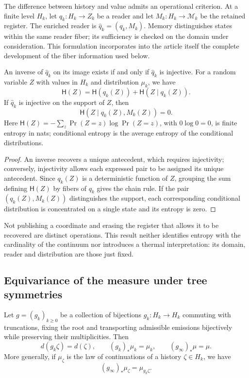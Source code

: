 The difference between history and value admits an operational criterion. At a
finite level \(H_k\), let \(q_k:H_k\to Z_k\) be a reader and let
\(M_k:H_k\to\mathcal M_k\) be the retained register. The enriched reader
is \(\widehat q_k=(q_k,M_k)\). Memory distinguishes states within the same
reader fiber; its sufficiency is checked on the domain under consideration.
This formulation incorporates into the article itself the complete development of the
fiber information used below.

\begin{proposition}
\label{prop:ch-recuperabilidad-fibra}
An inverse of \(\widehat q_k\) on its image exists if and only if
\(\widehat q_k\) is injective. For a random variable \(Z\) with
values in \(H_k\) and distribution \(\mu_k\), we have
\[
 \mathsf H(Z)=\mathsf H(q_k(Z))+\mathsf H(Z\mid q_k(Z)).
\]
If \(\widehat q_k\) is injective on the support of \(Z\), then
\[
 \mathsf H(Z\mid q_k(Z),M_k(Z))=0.
\]
Here \(\mathsf H(Z)=-\sum_z\Pr(Z=z)\log\Pr(Z=z)\), with
\(0\log0=0\), is finite entropy in nats; conditional entropy is
the average entropy of the conditional distributions.
\end{proposition}

\begin{proof}
An inverse recovers a unique antecedent, which requires injectivity;
conversely, injectivity allows each expressed pair to be assigned its unique
antecedent. Since \(q_k(Z)\) is a deterministic function of \(Z\),
grouping the sum defining \(\mathsf H(Z)\) by fibers of \(q_k\) gives the
chain rule. If the pair \((q_k(Z),M_k(Z))\) distinguishes the support,
each corresponding conditional distribution is concentrated on a single
state and its entropy is zero.
\end{proof}

Not publishing a coordinate and erasing the register that allows it to be recovered are
distinct operations. This result neither identifies entropy with the cardinality
of the continuum nor introduces a thermal interpretation: its domain, reader and
distribution are those just fixed.

\subsection{Equivariance of the measure under tree symmetries}
\label{sec:ch-naturalidad-medida}

\begin{proposition}
\label{prop:ch-naturalidad-medida}
Let \(g=(g_k)_{k\geq0}\) be a collection of bijections \(g_k:H_k\to H_k\)
commuting with truncations, fixing the root and transporting
admissible emissions bijectively while preserving their multiplicities. Then
\[
 d(g_k\zeta)=d(\zeta),\qquad
 (g_k)_*\mu_k=\mu_k,\qquad (g_\infty)_*\mu=\mu.
\]
More generally, if \(\mu_\zeta\) is the law of continuations of a
history \(\zeta\in H_k\), we have
\[
 (g_\infty)_*\mu_\zeta=\mu_{g_k\zeta}.
\]
\end{proposition}

